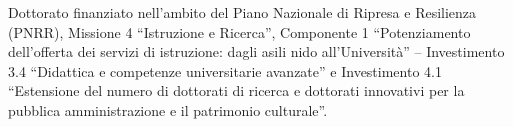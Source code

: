 Dottorato finanziato nell'ambito del Piano Nazionale di Ripresa e Resilienza (PNRR), Missione 4 ``Istruzione e Ricerca'', Componente 1 ``Potenziamento dell'offerta dei servizi di istruzione: dagli asili nido all'Università'' -- Investimento 3.4 ``Didattica e competenze universitarie avanzate'' e Investimento 4.1 ``Estensione del numero di dottorati di ricerca e dottorati innovativi per la pubblica amministrazione e il patrimonio culturale''.

